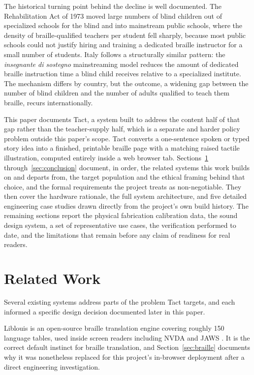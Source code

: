 \documentclass[conference]{IEEEtran}
\begin{document}
The historical turning point behind the decline is well documented. The Rehabilitation Act of 1973 moved large numbers of blind children out of specialized schools for the blind and into mainstream public schools, where the density of braille-qualified teachers per student fell sharply, because most public schools could not justify hiring and training a dedicated braille instructor for a small number of students. Italy follows a structurally similar pattern: the \emph{insegnante di sostegno} mainstreaming model reduces the amount of dedicated braille instruction time a blind child receives relative to a specialized institute. The mechanism differs by country, but the outcome, a widening gap between the number of blind children and the number of adults qualified to teach them braille, recurs internationally.

This paper documents Tact, a system built to address the content half of that gap rather than the teacher-supply half, which is a separate and harder policy problem outside this paper's scope. Tact converts a one-sentence spoken or typed story idea into a finished, printable braille page with a matching raised tactile illustration, computed entirely inside a web browser tab. Sections~\ref{sec:related} through~\ref{sec:conclusion} document, in order, the related systems this work builds on and departs from, the target population and the ethical framing behind that choice, and the formal requirements the project treats as non-negotiable. They then cover the hardware rationale, the full system architecture, and five detailed engineering case studies drawn directly from the project's own build history. The remaining sections report the physical fabrication calibration data, the sound design system, a set of representative use cases, the verification performed to date, and the limitations that remain before any claim of readiness for real readers.

\section{Related Work}\label{sec:related}

Several existing systems address parts of the problem Tact targets, and each informed a specific design decision documented later in this paper.

Liblouis is an open-source braille translation engine covering roughly 150 language tables, used inside screen readers including NVDA and JAWS \cite{liblouis}. It is the correct default instinct for braille translation, and Section~\ref{sec:braille} documents why it was nonetheless replaced for this project's in-browser deployment after a direct engineering investigation.
\end{document}
